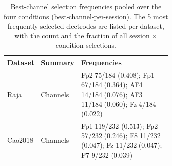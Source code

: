 \begin{table}[ht]
  \centering
  \scriptsize
  \setlength{\tabcolsep}{3pt}
  \caption{Best-channel selection frequencies pooled over the four conditions (best-channel-per-session). The 5 most frequently selected electrodes are listed per dataset, with the count and the fraction of all session $\times$ condition selections.}
  \label{tab:channel_selection}
  \begin{tabular}{llp{0.66\linewidth}}
    \toprule
    Dataset & Summary & Frequencies \\
    \midrule
    Raja & Channels & Fp2 75/184 (0.408); Fp1 67/184 (0.364); AF4 14/184 (0.076); AF3 11/184 (0.060); Fz 4/184 (0.022) \\
    Cao2018 & Channels & Fp1 119/232 (0.513); Fp2 57/232 (0.246); F8 11/232 (0.047); Fz 11/232 (0.047); F7 9/232 (0.039) \\
    \bottomrule
  \end{tabular}
\end{table}
